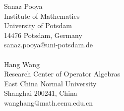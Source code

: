 \documentclass[a4paper,leqno,12pt]{article}
\numberwithin{equation}{section}
\theoremstyle{plain}
\theoremstyle{definition}
\theoremstyle{remark}
\begin{document}
	
	
	
	
	
	\vspace{2em}
	\begin{minipage}[t]{0.45\linewidth}
		\small
		Sanaz Pooya \\
		Institute of Mathematics\\
		University of Potsdam\\
		14476 Potsdam, Germany\\
		{\footnotesize sanaz.pooya@uni-potsdam.de}
		\\   
		\\
		\small 
		Hang Wang \\ Research Center of Operator Algebras \\
		East China Normal University\\
		Shanghai 200241, China \\
		{\footnotesize wanghang@math.ecnu.edu.cn}
	\end{minipage}
\end{document}
